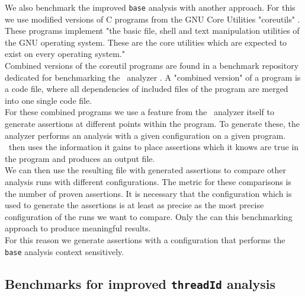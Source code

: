       We also benchmark the improved \texttt{base} analysis with another approach. For this we use modified versions of C programs from the GNU Core Utilities "coreutils" \parencite{gnuCoreutils}. These programs implement "the basic file, shell and text manipulation utilities of the GNU operating system. These are the core utilities which are expected to exist on every operating system."\parencite{gnuCoreutils}\\
      Combined versions of the coreutil programs are found in a benchmark repository dedicated for benchmarking the \gob\ analyzer \parencite{goblintBench}. A "combined version" of a program is a code file, where all dependencies of included files of the program are merged into one single code file.\\
      For these combined programs we use a feature from the \gob\ analyzer itself to generate assertions at different points within the program. To generate these, the analyzer performs an analysis with a given configuration on a given program. \gob\ then uses the information it gains to place assertions which it knows are true in the program and produces an output file.\\
      We can then use the resulting file with generated assertions to compare other analysis runs with different configurations. The metric for these comparisons is the number of proven assertions. It is necessary that the configuration which is used to generate the assertions is at least as precise as the most precise configuration of the runs we want to compare. Only the can this benchmarking approach to produce meaningful results.\\
      For this reason we generate assertions with a configuration that performs the \texttt{base} analysis context sensitively.\\
    
    \subsection{Benchmarks for improved \texttt{threadId} analysis}

